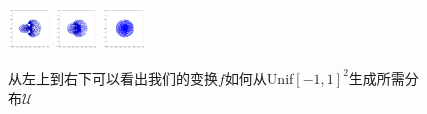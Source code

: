 \documentclass[lang=cn,11pt]{elegantpaper}
\begin{document}
\begin{figure}[htbp]
  \includegraphics[width=0.1\textwidth]{circle_1_81}
  \includegraphics[width=0.1\textwidth]{circle_1_9}
  \includegraphics[width=0.1\textwidth]{circle_1_10}
  \caption{从左上到右下可以看出我们的变换$f$如何从Unif$[-1,1]^2$生成所需分布$\mathcal U$}
\end{figure}
\end{document}
